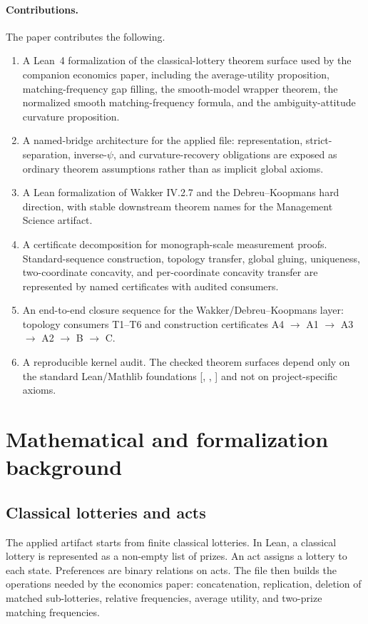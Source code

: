 \documentclass[11pt,english]{article}
\newcommand{\code}[1]{\texttt{\detokenize{#1}}}
\newcommand{\foundations}{[\code{propext}, \code{Classical.choice}, \code{Quot.sound}]}
\begin{document}
\paragraph{Contributions.}
The paper contributes the following.
\begin{enumerate}[leftmargin=*]
\item A Lean~4 formalization of the classical-lottery theorem surface used by the companion economics paper, including the average-utility proposition, matching-frequency gap filling, the smooth-model wrapper theorem, the normalized smooth matching-frequency formula, and the ambiguity-attitude curvature proposition.
\item A named-bridge architecture for the applied file: representation, strict-separation, inverse-\(\psi\), and curvature-recovery obligations are exposed as ordinary theorem assumptions rather than as implicit global axioms.
\item A Lean formalization of Wakker IV.2.7 and the Debreu--Koopmans hard direction, with stable downstream theorem names for the Management Science artifact.
\item A certificate decomposition for monograph-scale measurement proofs.  Standard-sequence construction, topology transfer, global gluing, uniqueness, two-coordinate concavity, and per-coordinate concavity transfer are represented by named certificates with audited consumers.
\item An end-to-end closure sequence for the Wakker/Debreu--Koopmans layer: topology consumers T1--T6 and construction certificates A4 \(\to\) A1 \(\to\) A3 \(\to\) A2 \(\to\) B \(\to\) C.
\item A reproducible kernel audit.  The checked theorem surfaces depend only on the standard Lean/Mathlib foundations \foundations{} and not on project-specific axioms.
\end{enumerate}

\section{Mathematical and formalization background}
\label{sec:background}

\subsection{Classical lotteries and acts}

The applied artifact starts from finite classical lotteries.  In Lean, a classical lottery is represented as a non-empty list of prizes.  An act assigns a lottery to each state.  Preferences are binary relations on acts.  The file then builds the operations needed by the economics paper: concatenation, replication, deletion of matched sub-lotteries, relative frequencies, average utility, and two-prize matching frequencies.
\end{document}
